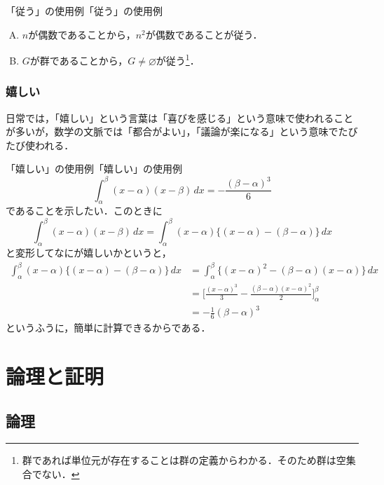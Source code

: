 \documentclass[a4paper,11pt]{ltjsarticle}
\begin{document}
\begin{example}{「従う」の使用例}{「従う」の使用例}
    \begin{enumerate}[(A)]
  \item $n$が偶数であることから，$n^2$が偶数であることが従う．\label{enu:偶数ならば偶数}
  \item $G$が群であることから，$G \ne \varnothing$が従う\footnote{群であれば単位元が存在することは群の定義からわかる．そのため群は空集合でない．}．\label{enu:群の例}
\end{enumerate}
\end{example}

\subsubsection{嬉しい}

日常では，「嬉しい」という言葉は「喜びを感じる」という意味で使われることが多いが，数学の文脈では「都合がよい」，「議論が楽になる」という意味でたびたび使われる．

\begin{example}{「嬉しい」の使用例}{「嬉しい」の使用例}
        \[
        \int_{\alpha}^{\beta} (x-\alpha)(x-\beta)\, dx = -\frac{(\beta-\alpha)^3}{6}
        \]
        であることを示したい．このときに
        \[
          \int_{\alpha}^{\beta} (x-\alpha)(x-\beta)\, dx = \int_{\alpha}^{\beta}  (x-\alpha)\{(x-\alpha) - (\beta-\alpha)\} \, dx
        \]
        と変形してなにが嬉しいかというと，
        \begin{align*} 
          \int_{\alpha}^{\beta}  (x-\alpha)\{(x-\alpha) - (\beta-\alpha)\} \, dx & = \int_{\alpha}^{\beta} \{  (x-\alpha)^2 -(\beta-\alpha)(x-\alpha) \} \, dx \\
          & = \Biggl [ \frac{(x-\alpha)^3}{3} - \frac{(\beta-\alpha)(x-\alpha)^2}{2} \Biggr ]_{\alpha}^{\beta} \\
          & = - \frac{1}{6} (\beta-\alpha)^3
        \end{align*}
        というふうに，簡単に計算できるからである．
  \end{example}


\newpage 

\section{論理と証明}
\subsection{論理}
\end{document}
